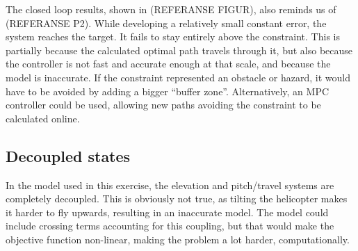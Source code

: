 The closed loop results, shown in (REFERANSE FIGUR), also reminds us of (REFERANSE P2). While developing a relatively small constant error, the system reaches the target. It fails to stay entirely above the constraint. This is partially because the calculated optimal path travels through it, but also because the controller is not fast and accurate enough at that scale, and because the model is inaccurate. If the constraint represented an obstacle or hazard, it would have to be avoided by adding a bigger ``buffer zone''. Alternatively, an MPC controller could be used, allowing new paths avoiding the constraint to be calculated online.

\subsection{Decoupled states}
In the model used in this exercise, the elevation and pitch/travel systems are completely decoupled. This is obviously not true, as tilting the helicopter makes it harder to fly upwards, resulting in an inaccurate model. The model could include crossing terms accounting for this coupling, but that would make the objective function non-linear, making the problem a lot harder, computationally.